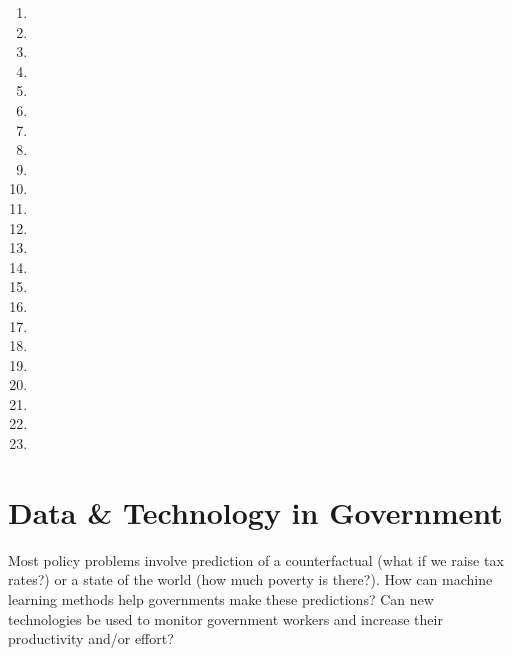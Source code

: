 \documentclass{article}
\begin{document}
\begin{enumerate}
\item {}
\item {}
\item {}
\item {}
\item {}
\item {}
\item {}
\item {}
\item {}
\item {}
\item {}
\item {}
\item {}
\item {}
\item {}
\item {}
\item {}
\item {}
\item {}
\item {}
\item {}
\item {}
\item {}
\end{enumerate}

\section{Data \& Technology in Government}
Most policy problems involve prediction of a counterfactual (what if we raise tax rates?) or a state of the world (how much poverty is there?). How can machine learning methods help governments make these predictions? Can new technologies be used to monitor government workers and increase their productivity and/or effort?
\end{document}
